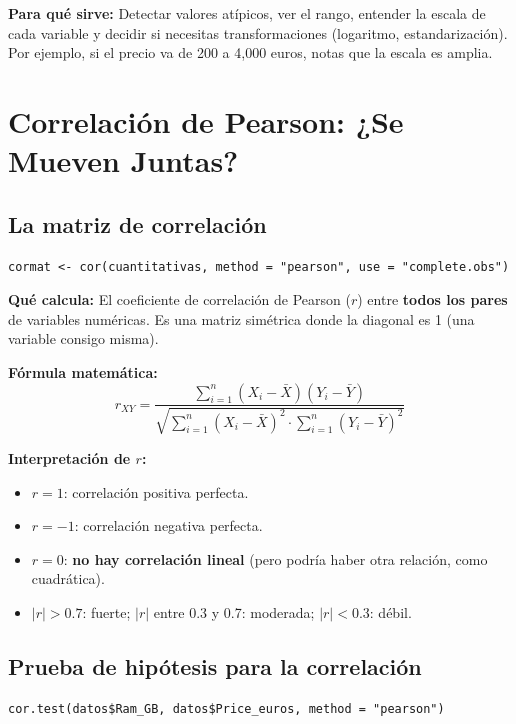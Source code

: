\documentclass[12pt,a4paper]{article}
\begin{document}
\textbf{Para qué sirve:} Detectar valores atípicos, ver el rango, entender la escala de cada variable y decidir si necesitas transformaciones (logaritmo, estandarización). Por ejemplo, si el precio va de 200 a 4,000 euros, notas que la escala es amplia.

\section{Correlación de Pearson: ¿Se Mueven Juntas?}

\subsection{La matriz de correlación}

\begin{lstlisting}[caption={Matriz de correlaciones}]
cormat <- cor(cuantitativas, method = "pearson", use = "complete.obs")
\end{lstlisting}

\textbf{Qué calcula:} El coeficiente de correlación de Pearson ($r$) entre \textbf{todos los pares} de variables numéricas. Es una matriz simétrica donde la diagonal es 1 (una variable consigo misma).

\textbf{Fórmula matemática:}
\[
r_{XY} = \frac{\sum_{i=1}^{n}(X_i - \bar{X})(Y_i - \bar{Y})}{\sqrt{\sum_{i=1}^{n}(X_i - \bar{X})^2 \cdot \sum_{i=1}^{n}(Y_i - \bar{Y})^2}}
\]

\textbf{Interpretación de $r$:}
\begin{itemize}
    \item $r = 1$: correlación positiva perfecta.
    \item $r = -1$: correlación negativa perfecta.
    \item $r = 0$: \textbf{no hay correlación lineal} (pero podría haber otra relación, como cuadrática).
    \item $|r| > 0.7$: fuerte; $|r|$ entre 0.3 y 0.7: moderada; $|r| < 0.3$: débil.
\end{itemize}

\subsection{Prueba de hipótesis para la correlación}

\begin{lstlisting}[caption={Prueba de correlación}]
cor.test(datos$Ram_GB, datos$Price_euros, method = "pearson")
\end{lstlisting}
\end{document}
